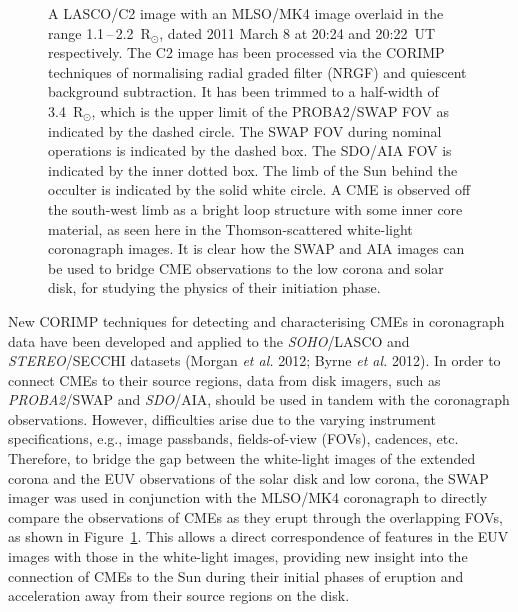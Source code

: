 \documentclass[preprint2]{aastex}
\begin{document}
\begin{figure}[!ht]
\caption{A LASCO/C2 image with an MLSO/MK4 image overlaid in the range 1.1\,--\,2.2~R$_\odot$, dated 2011 March 8 at 20:24 and 20:22~UT respectively. The C2 image has been processed via the CORIMP techniques of normalising radial graded filter (NRGF) and quiescent background subtraction. It has been trimmed to a half-width of 3.4~R$_\odot$, which is the upper limit of the PROBA2/SWAP FOV as indicated by the dashed circle. The SWAP FOV during nominal operations is indicated by the dashed box. The SDO/AIA FOV is indicated by the inner dotted box. The limb of the Sun behind the occulter is indicated by the solid white circle. A CME is observed off the south-west limb as a bright loop structure with some inner core material, as seen here in the Thomson-scattered white-light coronagraph images. It is clear how the SWAP and AIA images can be used to bridge CME observations to the low corona and solar disk, for studying the physics of their initiation phase.}
\label{overlays}
\end{figure}

New CORIMP techniques for detecting and characterising CMEs in coronagraph data have been developed and applied to the \emph{SOHO}/LASCO and \emph{STEREO}/SECCHI datasets (Morgan \emph{et al.} 2012; Byrne \emph{et al.} 2012). In order to connect CMEs to their source regions, data from disk imagers, such as \emph{PROBA2}/SWAP and \emph{SDO}/AIA, should be used in tandem with the coronagraph observations. However, difficulties arise due to the varying instrument specifications, e.g., image passbands, fields-of-view (FOVs), cadences, etc. Therefore, to bridge the gap between the white-light images of the extended corona and the EUV observations of the solar disk and low corona, the SWAP imager was used in conjunction with the MLSO/MK4 coronagraph to directly compare the observations of CMEs as they erupt through the overlapping FOVs, as shown in Figure~\ref{overlays}. This allows a direct correspondence of features in the EUV images with those in the white-light images, providing new insight into the connection of CMEs to the Sun during their initial phases of eruption and acceleration away from their source regions on the disk.
\end{document}
